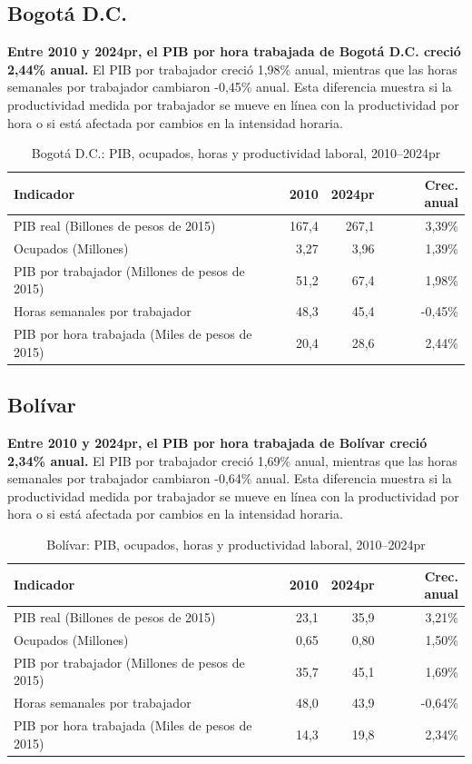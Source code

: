 \subsection{Bogotá D.C.}
\textbf{Entre 2010 y 2024pr, el PIB por hora trabajada de Bogotá D.C. creció 2,44\% anual.} El PIB por trabajador creció 1,98\% anual, mientras que las horas semanales por trabajador cambiaron -0,45\% anual. Esta diferencia muestra si la productividad medida por trabajador se mueve en línea con la productividad por hora o si está afectada por cambios en la intensidad horaria.
\begin{table}[H]
\centering
\caption{Bogotá D.C.: PIB, ocupados, horas y productividad laboral, 2010--2024pr}
\label{tab:departamento_bogota_dc_productividad}
\scriptsize
\begin{tabular}{lrrr}
\toprule
Indicador & 2010 & 2024pr & Crec. anual \\
\midrule
PIB real (Billones de pesos de 2015) & 167,4 & 267,1 & 3,39\% \\
Ocupados (Millones) & 3,27 & 3,96 & 1,39\% \\
PIB por trabajador (Millones de pesos de 2015) & 51,2 & 67,4 & 1,98\% \\
Horas semanales por trabajador & 48,3 & 45,4 & -0,45\% \\
PIB por hora trabajada (Miles de pesos de 2015) & 20,4 & 28,6 & 2,44\% \\
\bottomrule
\end{tabular}
\end{table}

\subsection{Bolívar}
\textbf{Entre 2010 y 2024pr, el PIB por hora trabajada de Bolívar creció 2,34\% anual.} El PIB por trabajador creció 1,69\% anual, mientras que las horas semanales por trabajador cambiaron -0,64\% anual. Esta diferencia muestra si la productividad medida por trabajador se mueve en línea con la productividad por hora o si está afectada por cambios en la intensidad horaria.
\begin{table}[H]
\centering
\caption{Bolívar: PIB, ocupados, horas y productividad laboral, 2010--2024pr}
\label{tab:departamento_bolivar_productividad}
\scriptsize
\begin{tabular}{lrrr}
\toprule
Indicador & 2010 & 2024pr & Crec. anual \\
\midrule
PIB real (Billones de pesos de 2015) & 23,1 & 35,9 & 3,21\% \\
Ocupados (Millones) & 0,65 & 0,80 & 1,50\% \\
PIB por trabajador (Millones de pesos de 2015) & 35,7 & 45,1 & 1,69\% \\
Horas semanales por trabajador & 48,0 & 43,9 & -0,64\% \\
PIB por hora trabajada (Miles de pesos de 2015) & 14,3 & 19,8 & 2,34\% \\
\bottomrule
\end{tabular}
\end{table}

